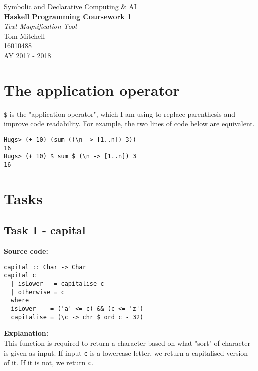 \documentclass[11pt]{article}
\begin{document}
\begin{titlepage}
\begin{center}

\huge{Symbolic and Declarative Computing \& AI} \\
\Huge{\textbf{Haskell Programming Coursework 1}} \\

\vfill
\huge{\textit{Text Magnification Tool}} \\


\vfill
\LARGE{Tom Mitchell} \\
\LARGE{16010488} \\
\LARGE{AY 2017 - 2018}

\end{center}
\end{titlepage}


\tableofcontents
\newpage

\section{The application operator}
{\verb|$|} is the "application operator", which I am using to replace parenthesis and improve code readability. For example, the two lines of code below are equivalent.
\begin{verbatim}
Hugs> (+ 10) (sum ((\n -> [1..n]) 3))
16
Hugs> (+ 10) $ sum $ (\n -> [1..n]) 3
16
\end{verbatim}

\section{Tasks}

\subsection{Task 1 - capital}
\textbf{Source code:}
\begin{verbatim}
capital :: Char -> Char                       
capital c                                    
  | isLower   = capitalise c                   
  | otherwise = c                             
  where 
  isLower    = ('a' <= c) && (c <= 'z')
  capitalise = (\c -> chr $ ord c - 32)
\end{verbatim}

\textbf{Explanation:} \\
This function is required to return a character based on what "sort" of character is given as input. If input {\verb|c|} is a lowercase letter, we return a capitalised version of it. If it is not, we return {\verb|c|}. \\
\end{document}
